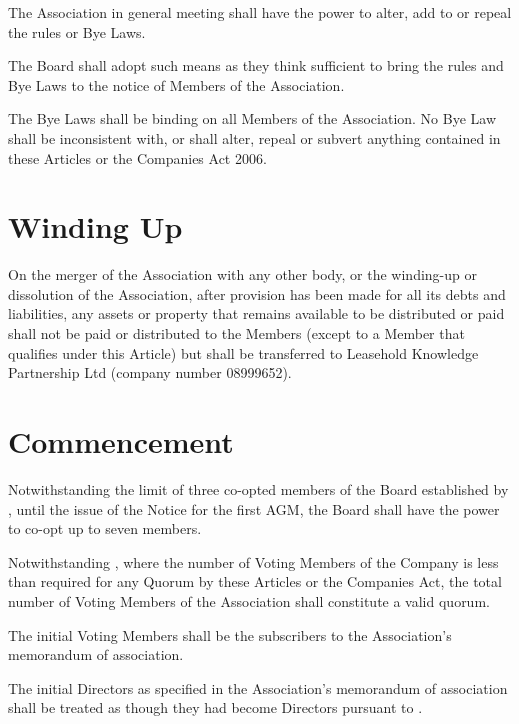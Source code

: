\documentclass[10pt]{mk-articles-of-association}
\newcommand{\EC}[0]{Board}
\newcommand{\Exec}[0]{\EC{} }
\begin{document}
\begin{constenum}
\item The Association in general meeting shall have the power to
  alter, add to or repeal the rules or Bye Laws.

\item The \Exec shall adopt such means as they think sufficient to
  bring the rules and Bye Laws to the notice of Members of the Association.

\item The Bye Laws shall be binding on all Members of the
  Association. No Bye Law shall be inconsistent with, or shall
  alter, repeal or subvert anything contained in these Articles or
  the Companies Act 2006.
\end{constenum}



\section{Winding Up}

On the merger of the Association with any other body, or the
  winding-up or dissolution of the Association, after provision has
  been made for all its debts and liabilities, any assets or property
  that remains available to be distributed or paid shall not be paid
  or distributed to the Members (except to a Member that qualifies
  under this Article) but shall be transferred to Leasehold Knowledge
  Partnership Ltd (company number 08999652).



\section{Commencement}

\begin{constenum}
  \item Notwithstanding the limit of three co-opted members of the
    \Exec established by , until the issue of
    the Notice for the first AGM, the \Exec shall have the power to
    co-opt up to seven members.

  \item Notwithstanding , where the number of
    Voting Members of the Company is less than required for any Quorum
    by these Articles or the Companies Act, the total number of Voting
    Members of the Association shall constitute a valid quorum.

  \item The initial Voting Members shall
    be the subscribers to the Association’s memorandum of association.

  \item The initial Directors as specified in the Association’s
    memorandum of association shall be treated as though they had
    become Directors pursuant to .

\end{constenum}
\end{document}
